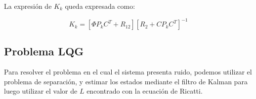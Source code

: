 La expresión de $K_k$ queda expresada como: 

\begin{equation}
    K_k = [\Phi P_k C^T + R_{12}][R_2 + C P_k C^T]^{-1}
\end{equation}

\subsection{Problema LQG}

Para resolver el problema en el cual el sistema presenta ruido, podemos utilizar el problema de separación, y estimar los estados mediante 
el filtro de Kalman para luego utilizar el valor de $L$ encontrado con la ecuación de Ricatti.